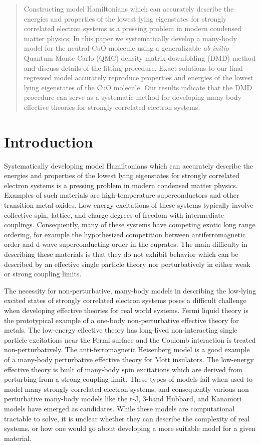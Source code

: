 \documentclass{article}
\begin{document}
\begin{abstract}
Constructing model Hamiltonians which can accurately describe the energies and properties of the lowest lying eigenstates for strongly correlated electron systems is a pressing problem in modern condensed matter physics.
In this paper we systematically develop a many-body model for the neutral CuO molecule using a generalizable \textit{ab-initio} Quantum Monte Carlo (QMC) density matrix downfolding (DMD) method and discuss details of the fitting procedure.
Exact solutions to our final regressed model accurately reproduce properties and energies of the lowest lying eigenstates of the CuO molecule.
Our results indicate that the DMD procedure can serve as a systematic method for developing many-body effective theories for strongly correlated electron systems.
\end{abstract}

\section{Introduction}
Systematically developing model Hamiltonians which can accurately describe the energies and properties of the lowest lying eigenstates for strongly correlated electron systems is a pressing problem in modern condensed matter physics. 
Examples of such materials are high-temperature superconductors and other transition metal oxides.
Low-energy excitations of these systems typically involve collective spin, lattice, and charge degrees of freedom with intermediate couplings.
Consequently, many of these systems have competing exotic long range ordering, for example the hypothesized competition between antiferromagnetic order and d-wave superconducting order in the cuprates.
The main difficulty in describing these materials is that they do not exhibit behavior which can be described by an effective single particle theory nor perturbatively in either weak or strong coupling limits.

The necessity for non-perturbative, many-body models in describing the low-lying excited states of strongly correlated electron systems poses a difficult challenge when developing effective theories for real world systems.
Fermi liquid theory is the prototypical example of a one-body non-perturbative effective theory for metals.
The low-energy effective theory has long-lived non-interacting single particle excitations near the Fermi surface and the Coulomb interaction is treated non-perturbatively.
The anti-ferromagnetic Heisenberg model is a good example of a many-body perturbative effective theory for Mott insulators.
The low-energy effective theory is built of many-body spin excitations which are derived from perturbing from a strong coupling limit.
These types of models fail when used to model many strongly correlated electron systems, and consequently various non-perturbative many-body models like the t-J, 3-band Hubbard, and Kanamori models have emerged as candidates.
While these models are computational tractable to solve, it is unclear whether they can describe the complexity of real systems, or how one would go about developing a more suitable model for a given material.
\end{document}
